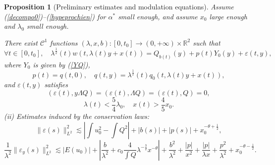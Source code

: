 \documentclass[11pt,a4paper,reqno]{amsart}
\newtheorem{proposition}[theorem]{Proposition}
\theoremstyle{remark}
\numberwithin{equation}{section}
\newcommand{\be}{\begin{equation}}
\newcommand{\ee}{\end{equation}}
\def\fref#1{{\rm (\ref{#1})}}
\def\e{\varepsilon}
\def\fref#1{{\rm (\ref{#1})}}
\def\l{\lambda}
\def\qz{q_0}
\def\pp{p}
\def\qnz{q}
\def\Yz{Y_0}
\begin{document}
  \begin{proposition}[Preliminary estimates and modulation equations]
\label{le:2}
Assume \fref{decompo0}--\fref{hypeprochien} for $\alpha^*$ small enough, and assume $x_0$ large enough and $\l_0$ small enough.

 There exist $\mathcal C^1$ functions $({\lambda}, x,{b}):[0,t_0]\to (0,+\infty)\times \mathbb{R}^2$ such that
\begin{equation}\label{defofeps}
\forall t\in [0,t_0],\quad
{\lambda}^{\frac 12}(t) w(t,{\lambda}(t) y + x(t)) =  Q_{{b}(t)}(y)
+\pp(t) \Yz(y) +\e(t,y),
\end{equation}
where $Y_0$ is given by \fref{YQ}, 
\be\label{defp}
\pp(t)= \qnz(t,0),\quad 
\qnz(t,y) = \l^{\frac 12}(t) \qz(t,\l(t) y +x(t)),
\ee
and   $\e(t,y)$
satisfies  
\be
\label{ortho1}
(\e(t), y {\Lambda}   Q )=(\e(t),\Lambda Q) =(\e(t),Q)=0,
\ee
\be\label{lambdax}
\l(t)<\frac 54 \l_0,\quad x(t)>\frac 45 x_0.
\ee
{\em (ii)   Estimates induced by the conservation laws:}
\be
\label{twobound}
  \|\e(s)\|^2_{L^2}\lesssim \left|\int u_0^2-\int Q^2\right| + |b(s)| +|p(s)| + x_0^{-\theta+\frac 12},
\ee
\be
\label{energbound}
  \frac 1{\l^2}\| \e_y(s)\|_{L^2}^2       \lesssim |E(u_0)| + \left|  \frac b{\l^2}  {+} c_0 \frac 4{\int Q}\l^{-\frac 32} x^{-\theta} \right|  
+ \frac {b^2}{\l^2}+  
 \frac { |p| }{x^2} + \frac { |p| }{\l x}  + \frac {p^2}{\l^2}  +  x_0^{-\theta-\frac 12} 
 .
   \ee
 

\end{proposition}
\end{document}
